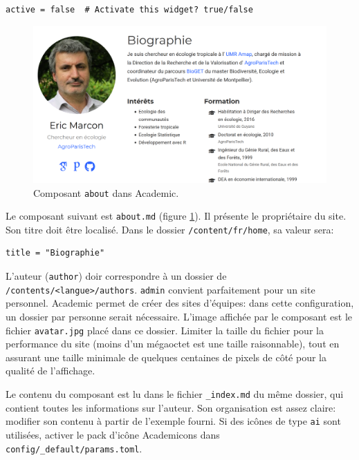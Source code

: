 \documentclass[
  11pt,
  french,
  a4paper,
  extrafontsizes,onecolumn,openright
  ]{memoir}
\begin{document}
\begin{verbatim}
active = false  # Activate this widget? true/false
\end{verbatim}



\scriptsize

\begin{figure}

{\centering \includegraphics[width=0.8\linewidth]{images/rediger-about} 

}

\caption{Composant \texttt{about} dans Academic.}\label{fig:rediger-about}
\end{figure}

\normalsize

Le composant suivant est \texttt{about.md} (figure \ref{fig:rediger-about}).
Il présente le propriétaire du site.
Son titre doit être localisé.
Dans le dossier \texttt{/content/fr/home}, sa valeur sera:

\begin{verbatim}
title = "Biographie"
\end{verbatim}

L'auteur (\texttt{author}) doir correspondre à un dossier de \texttt{/contents/\textless{}langue\textgreater{}/authors}.
\texttt{admin} convient parfaitement pour un site personnel.
Academic permet de créer des sites d'équipes: dans cette configuration, un dossier par personne serait nécessaire.
L'image affichée par le composant est le fichier \texttt{avatar.jpg} placé dans ce dossier.
Limiter la taille du fichier pour la performance du site (moins d'un mégaoctet est une taille raisonnable), tout en assurant une taille minimale de quelques centaines de pixels de côté pour la qualité de l'affichage.

Le contenu du composant est lu dans le fichier \texttt{\_index.md} du même dossier, qui contient toutes les informations sur l'auteur.
Son organisation est assez claire: modifier son contenu à partir de l'exemple fourni.
Si des icônes de type \texttt{ai} sont utilisées, activer le pack d'icône Academicons dans \texttt{config/\_default/params.toml}.
\end{document}
